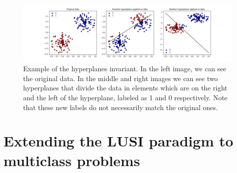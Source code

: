 \begin{figure}[h]
    \centering
    \includegraphics[width=\textwidth]{thesis/Figures/random_hyperplanes_example.png}
    \caption{Example of the hyperplanes invariant. In the left image, we can see the original data. In
    the middle and right images we can see two hyperplanes that divide the data in elements which are
    on the right and the left of the hyperplane, labeled as 1 and 0 respectively. Note that these
    new labels do not necessarily match the original ones.}
    \label{fig:random_hyperplanes_example}
\end{figure}

\section{Extending the LUSI paradigm to multiclass problems}

